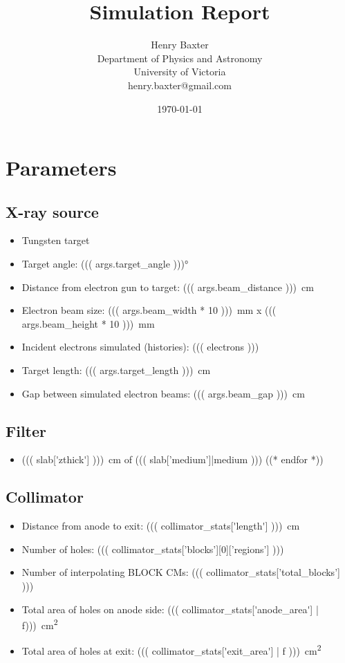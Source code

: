 \documentclass[12pt]{article}
\title{Simulation Report}
\author{
        Henry Baxter \\
                Department of Physics and Astronomy\\
        University of Victoria\\
        henry.baxter@gmail.com
}
\date{\today}
\begin{document}
\maketitle

\tableofcontents

\section{Parameters}

\subsection{X-ray source}
\begin{itemize}
	\item Tungsten target
	\item Target angle: \ang{((( args.target_angle )))}
	\item Distance from electron gun to target: \SI{((( args.beam_distance )))}{\cm}
	\item Electron beam size: \SI{((( args.beam_width * 10 )))}{\mm} x \SI{((( args.beam_height * 10 )))}{\mm}
	\item Incident electrons simulated (histories): ((( electrons )))
	\item Target length: \SI{((( args.target_length )))}{\cm}
	\item Gap between simulated electron beams: \SI{((( args.beam_gap )))}{\cm}
\end{itemize}

\subsection{Filter}
\begin{itemize}
	((* for slab in _filter['cms'][0]['slabs'] *))
	\item \SI{((( slab['zthick'] )))}{\cm} of ((( slab['medium']|medium )))
	((* endfor *))
\end{itemize}

\subsection{Collimator}
\begin{itemize}
	\item Distance from anode to exit: \SI{((( collimator_stats['length'] )))}{\cm}
	\item Number of holes: ((( collimator_stats['blocks'][0]['regions'] )))
	\item Number of interpolating BLOCK CMs: ((( collimator_stats['total_blocks'] )))
	\item Total area of holes on anode side: \SI{((( collimator_stats['anode_area'] | f)))}{\cm\squared}
	\item Total area of holes at exit: \SI{((( collimator_stats['exit_area'] | f )))}{\cm\squared}
\end{itemize}
\end{document}
